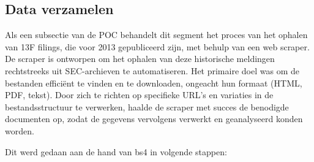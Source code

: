 \subsection{Data verzamelen}
Als een subsectie van de POC behandelt dit segment het proces van het ophalen van 13F filings, die voor 2013 gepubliceerd zijn, met behulp van een web scraper. De scraper is ontworpen om het ophalen van deze historische meldingen rechtstreeks uit SEC-archieven te automatiseren. Het primaire doel was om de bestanden efficiënt te vinden en te downloaden, ongeacht hun formaat (HTML, PDF, tekst). Door zich te richten op specifieke URL's en variaties in de bestandsstructuur te verwerken, haalde de scraper met succes de benodigde documenten op, zodat de gegevens vervolgens verwerkt en geanalyseerd konden worden.

Dit werd gedaan aan de hand van bs4 in volgende stappen:
